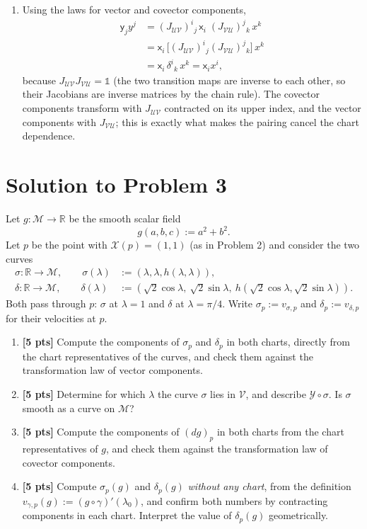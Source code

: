 \documentclass[11pt]{article}
\newcommand{\probThree}{%
Let $g:\mathcal M\to\mathbb R$ be the smooth scalar field
\[
g(a,b,c):=a^2+b^2.
\]
Let $p$ be the point with $\mathcal X(p)=(1,1)$ (as in Problem 2) and consider the two curves
\begin{align*}
\sigma:\mathbb R\to\mathcal M,\qquad \sigma(\lambda)&:=(\lambda,\lambda,h(\lambda,\lambda)),\\
\delta:\mathbb R\to\mathcal M,\qquad \delta(\lambda)&:=(\sqrt2\cos\lambda,\ \sqrt2\sin\lambda,\ h(\sqrt2\cos\lambda,\sqrt2\sin\lambda)).
\end{align*}
Both pass through $p$: $\sigma$ at $\lambda=1$ and $\delta$ at $\lambda=\pi/4$. Write $\sigma_p:=v_{\sigma,p}$ and $\delta_p:=v_{\delta,p}$ for their velocities at $p$.
\begin{enumerate}[label=(\alph*)]
\item \textbf{[5 pts]} Compute the components of $\sigma_p$ and $\delta_p$ in both charts, directly from the chart representatives of the
curves, and check them against the transformation law of vector components.
\item \textbf{[5 pts]} Determine for which $\lambda$ the curve $\sigma$ lies in $\mathcal V$, and describe $\mathcal Y\circ\sigma$. Is $\sigma$ smooth
as a curve on $\mathcal M$?
\item \textbf{[5 pts]} Compute the components of $(dg)_p$ in both charts from the chart representatives of $g$, and check them against the
transformation law of covector components.
\item \textbf{[5 pts]} Compute $\sigma_p(g)$ and $\delta_p(g)$ \emph{without any chart}, from the definition $v_{\gamma,p}(g):=(g\circ\gamma)'(\lambda_0)$,
and confirm both numbers by contracting components in each chart. Interpret the value of $\delta_p(g)$ geometrically.
\end{enumerate}}
\begin{document}
\begin{enumerate}[label=(\alph*)]
\begin{align*}
\mathsf y_1&=\tfrac1{\sqrt2}\cdot3+\tfrac1{\sqrt2}\cdot1=2\sqrt2,\\
\mathsf y_2&=-1\cdot3+1\cdot1=-2.
\end{align*}
The contractions are
\begin{align*}
\mathsf x_ix^i&=3\cdot2+1\cdot(-1)=5,\\
\mathsf y_iy^i&=2\sqrt2\cdot\tfrac1{\sqrt2}+(-2)\cdot\bigl(-\tfrac32\bigr)=2+3=5.
\end{align*}
\item Using the laws for vector and covector components,
\begin{align*}
\mathsf y_jy^j&=(J_{\mathcal{UV}})^i{}_j\,\mathsf x_i\;(J_{\mathcal{VU}})^j{}_k\,x^k\\
&=\mathsf x_i\,\bigl[(J_{\mathcal{UV}})^i{}_j(J_{\mathcal{VU}})^j{}_k\bigr]\,x^k\\
&=\mathsf x_i\,\delta^i{}_k\,x^k=\mathsf x_ix^i,
\end{align*}
because $J_{\mathcal{UV}}J_{\mathcal{VU}}=\mathbb 1$ (the two transition maps are inverse to each other, so their Jacobians are inverse matrices by
the chain rule). The covector components transform with $J_{\mathcal{UV}}$ contracted on its upper index, and the vector components with
$J_{\mathcal{VU}}$; this is exactly what makes the pairing cancel the chart dependence.
\end{enumerate}

\section*{Solution to Problem 3}
\probThree
\end{document}
